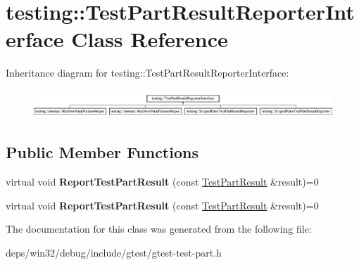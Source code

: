 \hypertarget{classtesting_1_1_test_part_result_reporter_interface}{}\section{testing\+:\+:Test\+Part\+Result\+Reporter\+Interface Class Reference}
\label{classtesting_1_1_test_part_result_reporter_interface}
Inheritance diagram for testing\+:\+:Test\+Part\+Result\+Reporter\+Interface\+:\begin{figure}[H]
\begin{center}
\leavevmode
\includegraphics[height=1.064639cm]{classtesting_1_1_test_part_result_reporter_interface}
\end{center}
\end{figure}
\subsection*{Public Member Functions}
\begin{DoxyCompactItemize}
\item 
\hypertarget{classtesting_1_1_test_part_result_reporter_interface_aa2f920e7a5a0a6d0faf19e3727928c22}{}virtual void {\bfseries Report\+Test\+Part\+Result} (const \hyperlink{classtesting_1_1_test_part_result}{Test\+Part\+Result} \&result)=0\label{classtesting_1_1_test_part_result_reporter_interface_aa2f920e7a5a0a6d0faf19e3727928c22}

\item 
\hypertarget{classtesting_1_1_test_part_result_reporter_interface_aa2f920e7a5a0a6d0faf19e3727928c22}{}virtual void {\bfseries Report\+Test\+Part\+Result} (const \hyperlink{classtesting_1_1_test_part_result}{Test\+Part\+Result} \&result)=0\label{classtesting_1_1_test_part_result_reporter_interface_aa2f920e7a5a0a6d0faf19e3727928c22}

\end{DoxyCompactItemize}


The documentation for this class was generated from the following file\+:\begin{DoxyCompactItemize}
\item 
deps/win32/debug/include/gtest/gtest-\/test-\/part.\+h\end{DoxyCompactItemize}
